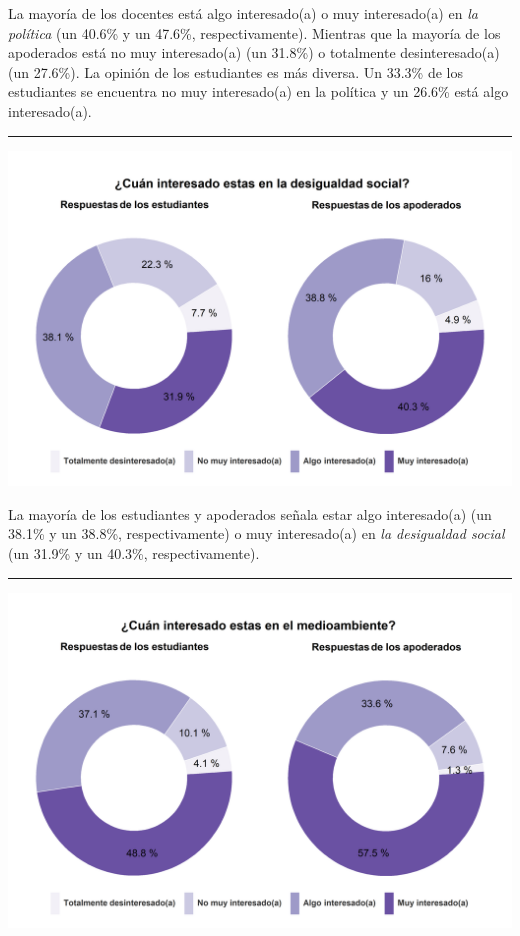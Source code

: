 \documentclass[
  14pt,
]{book}
\let\origfigure\figure
\let\endorigfigure\endfigure
\renewenvironment{figure}[1][2] {
  \expandafter\origfigure\expandafter[H]
} {
  \endorigfigure
}
\begin{document}
La mayoría de los docentes está algo interesado(a) o muy interesado(a) en \emph{la política} (un 40.6\% y un 47.6\%, respectivamente). Mientras que la mayoría de los apoderados está no muy interesado(a) (un 31.8\%) o totalmente desinteresado(a) (un 27.6\%). La opinión de los estudiantes es más diversa. Un 33.3\% de los estudiantes se encuentra no muy interesado(a) en la política y un 26.6\% está algo interesado(a).

\begin{center}\rule{0.5\linewidth}{0.5pt}\end{center}

\begin{figure}[!ht]

{\centering \includegraphics[width=0.8\linewidth,]{images/graph_intdes} 

}

\caption{Interés en la desigualdad social}\label{fig:unnamed-chunk-38}
\end{figure}

La mayoría de los estudiantes y apoderados señala estar algo interesado(a) (un 38.1\% y un 38.8\%, respectivamente) o muy interesado(a) en \emph{la desigualdad social} (un 31.9\% y un 40.3\%, respectivamente).

\begin{center}\rule{0.5\linewidth}{0.5pt}\end{center}

\begin{figure}[!ht]

{\centering \includegraphics[width=0.8\linewidth,]{images/graph_intmed} 

}

\caption{Interés en el medioambiente}\label{fig:unnamed-chunk-39}
\end{figure}
\end{document}
